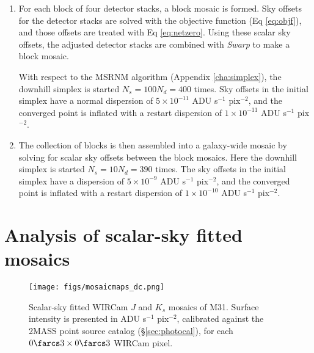\documentclass[iop]{emulateapj}
\newcommand{\ie}{\textit{i.e.}}
\newcommand{\vect}[1]{\boldsymbol{#1}} %
\newcommand{\sw}[1]{\textit{#1}} %
\begin{document}
\begin{enumerate}
    \item\label{ls:blockopt} For each block of four detector stacks, a block mosaic is formed. Sky offsets for the detector stacks are solved with the objective function (Eq \ref{eq:objf}), and those offsets are treated with Eq \ref{eq:netzero}. Using these scalar sky offsets, the adjusted detector stacks are combined with \sw{Swarp} to make a block mosaic.
    
    With respect to the MSRNM algorithm (Appendix \ref{cha:simplex}), the downhill simplex is started $N_s=100N_d=400$ times. Sky offsets in the initial simplex have a normal dispersion of $5\times10^{-11}$ ADU s$^{-1}$ pix$^{-2}$, and the converged point is inflated with a restart dispersion of $1\times10^{-11}$ ADU s$^{-1}$ pix$^{-2}$.
    
    \item\label{ls:mosaicopt} The collection of blocks is then assembled into a galaxy-wide mosaic by solving for scalar sky offsets between the block mosaics. Here the downhill simplex is started $N_s=10N_d=390$ times. The sky offsets in the initial simplex have a dispersion of $5\times10^{-9}$ ADU s$^{-1}$ pix$^{-2}$, and the converged point is inflated with a restart dispersion of $1\times10^{-10}$ ADU s$^{-1}$ pix$^{-2}$.

\end{enumerate}

\section{Analysis of scalar-sky fitted mosaics}
\label{sec:scalaranalysis}

\begin{figure}[p]
    \centering
        \texttt{[image: figs/mosaicmaps\_dc.png]}
    \caption[Scalar-sky fitted WIRCam $J$ and $K_s$ mosaics of M31]{Scalar-sky fitted WIRCam $J$ and $K_s$ mosaics of M31. Surface intensity is presented in ADU s$^{-1}$ pix$^{-2}$, calibrated against the 2MASS point source catalog (\S\ref{sec:photocal}), for each $0\farcs3\times0\farcs3$ WIRCam pixel.}
    \label{fig:mosaicmaps_dc}
\end{figure}
\end{document}
